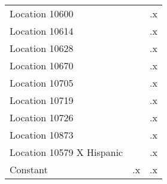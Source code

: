 \begin{tabular}{l*{2}{c}}
Location 10600      &            &          .x\\
Location 10614      &            &          .x\\
Location 10628      &            &          .x\\
Location 10670      &            &          .x\\
Location 10705      &            &          .x\\
Location 10719      &            &          .x\\
Location 10726      &            &          .x\\
Location 10873      &            &          .x\\
Location 10579 X Hispanic&            &          .x\\
Constant            &          .x&          .x\\
\hline\hline
\end{tabular}
